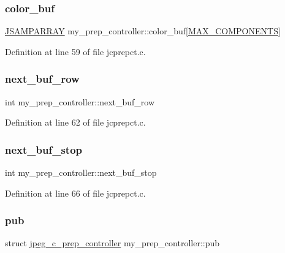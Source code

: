 \subsubsection{\texorpdfstring{color\_buf}{color\_buf}}
{\footnotesize\ttfamily \mbox{\hyperlink{jpeglib_8h_ac9d5d1b829ed51769db69a37271a7e91}{J\+S\+A\+M\+P\+A\+R\+R\+AY}} my\+\_\+prep\+\_\+controller\+::color\+\_\+buf\mbox{[}\mbox{\hyperlink{jmorecfg_8h_a6d8c910a1fdb6d4762a05f7250e64322}{M\+A\+X\+\_\+\+C\+O\+M\+P\+O\+N\+E\+N\+TS}}\mbox{]}}



Definition at line 59 of file jcprepct.\+c.

\mbox{\label{structmy__prep__controller_af93cf69d2ea14660586c93a1b08774a2}} 
\subsubsection{\texorpdfstring{next\_buf\_row}{next\_buf\_row}}
{\footnotesize\ttfamily int my\+\_\+prep\+\_\+controller\+::next\+\_\+buf\+\_\+row}



Definition at line 62 of file jcprepct.\+c.

\mbox{\label{structmy__prep__controller_a1332bc531a2d55aaef228a3a9a3fd62f}} 
\subsubsection{\texorpdfstring{next\_buf\_stop}{next\_buf\_stop}}
{\footnotesize\ttfamily int my\+\_\+prep\+\_\+controller\+::next\+\_\+buf\+\_\+stop}



Definition at line 66 of file jcprepct.\+c.

\mbox{\label{structmy__prep__controller_a3fb45ffb334d46e9786e32eefded333a}} 
\subsubsection{\texorpdfstring{pub}{pub}}
{\footnotesize\ttfamily struct \mbox{\hyperlink{structjpeg__c__prep__controller}{jpeg\+\_\+c\+\_\+prep\+\_\+controller}} my\+\_\+prep\+\_\+controller\+::pub}



